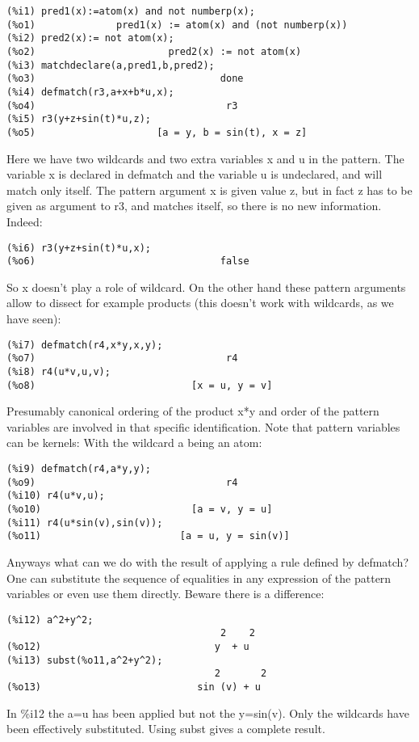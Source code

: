 \documentclass[a4paper,11pt]{article}
\begin{document}
\begin{verbatim}
(%i1) pred1(x):=atom(x) and not numberp(x);
(%o1)              pred1(x) := atom(x) and (not numberp(x))
(%i2) pred2(x):= not atom(x);
(%o2)                       pred2(x) := not atom(x)
(%i3) matchdeclare(a,pred1,b,pred2);
(%o3)                                done
(%i4) defmatch(r3,a+x+b*u,x);
(%o4)                                 r3
(%i5) r3(y+z+sin(t)*u,z);
(%o5)                     [a = y, b = sin(t), x = z]
\end{verbatim}
Here we have two wildcards and two extra variables x and u in the
pattern.  The variable x is declared in defmatch and the variable u is
undeclared, and will match only itself. The pattern argument x is
given value z, but in fact z has to be given as argument to r3, and
matches itself, so there is no new information. Indeed:
\begin{verbatim}
(%i6) r3(y+z+sin(t)*u,x);
(%o6)                                false
\end{verbatim}
So x doesn't play a role of wildcard. On the other hand these pattern
arguments allow to dissect for example products (this doesn't work with
wildcards, as we have seen):
\begin{verbatim}
(%i7) defmatch(r4,x*y,x,y);
(%o7)                                 r4
(%i8) r4(u*v,u,v);
(%o8)                           [x = u, y = v]
\end{verbatim}
Presumably canonical ordering of the product x*y and order of the
pattern variables are involved in that specific identification.
Note that pattern variables can be kernels:
With the wildcard a being an atom:

\begin{verbatim}
(%i9) defmatch(r4,a*y,y);
(%o9)                                 r4
(%i10) r4(u*v,u);
(%o10)                          [a = v, y = u]
(%i11) r4(u*sin(v),sin(v));
(%o11)                        [a = u, y = sin(v)]
\end{verbatim}

Anyways what can we do with the result of applying a rule defined by defmatch?
One can substitute the sequence of equalities in any expression of the pattern variables
or even use them directly. Beware there is a difference:

\begin{verbatim}
(%i12) a^2+y^2;
                                     2    2
(%o12)                              y  + u
(%i13) subst(%o11,a^2+y^2);
                                    2       2
(%o13)                           sin (v) + u
\end{verbatim}
In \%i12 the a=u has been applied but not the y=sin(v). Only the wildcards  have
been effectively substituted.  Using subst gives a complete result.
\end{document}
